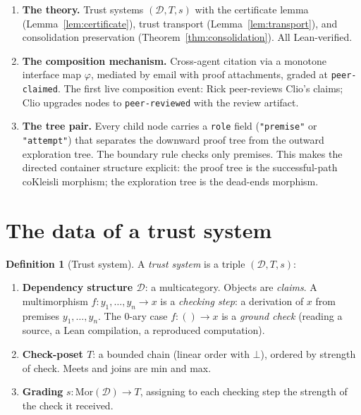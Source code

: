 \documentclass[11pt,a4paper]{article}
\newcommand{\level}[1]{\texttt{#1}}
\newcommand{\field}[1]{\texttt{#1}}
\theoremstyle{plain}
\theoremstyle{definition}
\newtheorem{definition}[theorem]{Definition}
\begin{document}
\begin{enumerate}
\item \textbf{The theory.} Trust systems $({\mathcal D}, T, s)$ with the
certificate lemma (Lemma~\ref{lem:certificate}), trust transport
(Lemma~\ref{lem:transport}), and consolidation preservation
(Theorem~\ref{thm:consolidation}). All Lean-verified.

\item \textbf{The composition mechanism.} Cross-agent citation via a
monotone interface map $\varphi$, mediated by email with proof
attachments, graded at \level{peer-claimed}. The first live composition
event: Rick peer-reviews Clio's claims; Clio upgrades nodes to
\level{peer-reviewed} with the review artifact.

\item \textbf{The tree pair.} Every child node carries a \field{role}
field (\field{"premise"} or \field{"attempt"}) that separates the
downward proof tree from the outward exploration tree. The boundary rule
checks only premises. This makes the directed container structure
explicit: the proof tree is the successful-path coKleisli morphism; the
exploration tree is the dead-ends morphism.
\end{enumerate}

\section{The data of a trust system}
\label{sec:trust-system}

\begin{definition}[Trust system]
\label{def:trust-system}
A \emph{trust system} is a triple $({\mathcal D}, T, s)$:
\begin{enumerate}
\item \textbf{Dependency structure ${\mathcal D}$}: a multicategory.
Objects are \emph{claims}. A multimorphism $f : y_1, \ldots, y_n \to x$
is a \emph{checking step}: a derivation of $x$ from premises
$y_1, \ldots, y_n$. The $0$-ary case $f : () \to x$ is a \emph{ground
check} (reading a source, a Lean compilation, a reproduced computation).

\item \textbf{Check-poset $T$}: a bounded chain (linear order with
$\bot$), ordered by strength of check. Meets and joins are min and max.

\item \textbf{Grading} $s : \mathrm{Mor}({\mathcal D}) \to T$, assigning
to each checking step the strength of the check it received.
\end{enumerate}
\end{definition}
\end{document}

